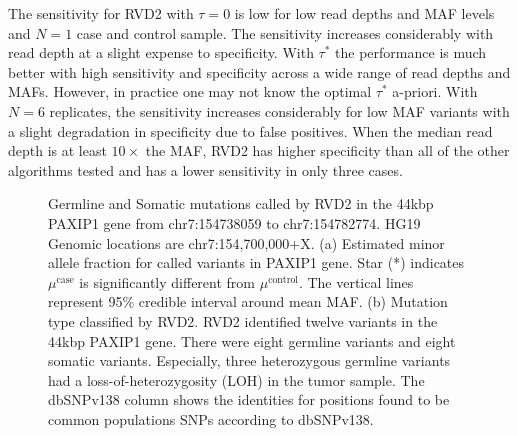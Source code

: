 \documentclass{bioinfo}
\begin{document}
The sensitivity for RVD2 with $\tau=0$ is low for low read depths and MAF levels and $N=1$ case and control sample. The sensitivity increases considerably with read depth at a slight expense to specificity. With $\tau^*$ the performance is much better with high sensitivity and specificity across a wide range of read depths and MAFs. However, in practice one may not know the optimal $\tau^*$ a-priori. With $N=6$ replicates, the sensitivity increases considerably for low MAF variants with a slight degradation in specificity due to false positives. When the median read depth is at least $10\times$ the MAF, RVD2 has higher specificity than all of the other algorithms tested and has a lower sensitivity in only three cases.
\begin{figure}[!bpth]
    \centering
    \caption{Germline and Somatic mutations called by RVD2 in the 44kbp PAXIP1 gene from chr7:154738059 to chr7:154782774. HG19 Genomic locations are chr7:154,700,000+X. (a) Estimated minor allele fraction for called variants in PAXIP1 gene. Star (*) indicates $\mu^{\text{case}}$ is significantly different from $ \mu^{\text{control}}$. The vertical lines represent 95\% credible interval around mean MAF. (b) Mutation type classified by RVD2. RVD2 identified twelve variants in the 44kbp PAXIP1 gene. There were eight germline variants and eight somatic variants. Especially, three heterozygous germline variants had a loss-of-heterozygosity (LOH) in the tumor sample. The dbSNPv138 column shows the identities for positions found to be common populations SNPs according to dbSNPv138.}%
    \label{fig:brca_MAF}%
\end{figure}
\end{document}
